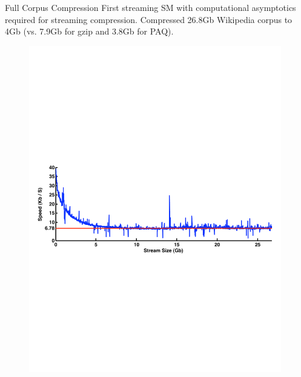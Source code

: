 \documentclass{beamer}
\begin{document}
\begin{frame}[t]{Full Corpus Compression}
First streaming SM with computational asymptotics required for streaming compression.  Compressed 26.8Gb Wikipedia corpus to 4Gb (vs. 7.9Gb for gzip and 3.8Gb for PAQ).
	   	\begin{figure}[t]
		\begin{center}
			\includegraphics[width = 11cm]{../figs/constant_speed_asymptote_small.pdf}
		\end{center}
	\end{figure}
\end{frame}
%
%	
%


%

\end{document}
